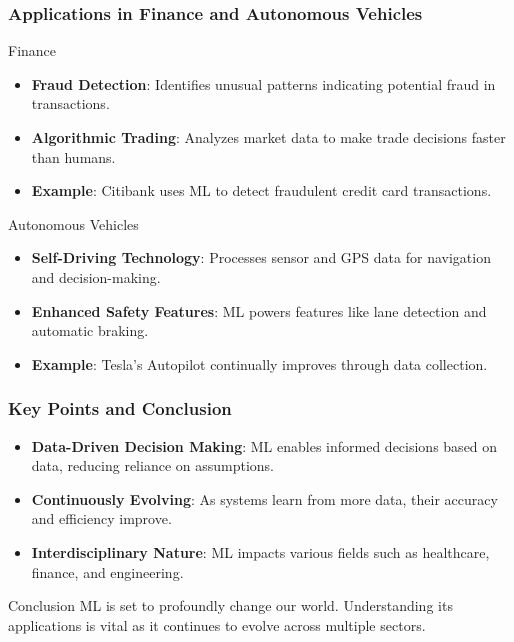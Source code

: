 \documentclass[aspectratio=169]{beamer}
\begin{document}
\begin{frame}[fragile]
    \frametitle{Applications in Finance and Autonomous Vehicles}
    \begin{block}{Finance}
        \begin{itemize}
            \item \textbf{Fraud Detection}: 
                Identifies unusual patterns indicating potential fraud in transactions.
            \item \textbf{Algorithmic Trading}: 
                Analyzes market data to make trade decisions faster than humans.
            \item \textbf{Example}:
                Citibank uses ML to detect fraudulent credit card transactions.
        \end{itemize}
    \end{block}
    
    \begin{block}{Autonomous Vehicles}
        \begin{itemize}
            \item \textbf{Self-Driving Technology}: 
                Processes sensor and GPS data for navigation and decision-making.
            \item \textbf{Enhanced Safety Features}: 
                ML powers features like lane detection and automatic braking.
            \item \textbf{Example}: 
                Tesla’s Autopilot continually improves through data collection.
        \end{itemize}
    \end{block}
\end{frame}

\begin{frame}[fragile]
    \frametitle{Key Points and Conclusion}
    \begin{itemize}
        \item \textbf{Data-Driven Decision Making}:
            ML enables informed decisions based on data, reducing reliance on assumptions.
        \item \textbf{Continuously Evolving}:
            As systems learn from more data, their accuracy and efficiency improve.
        \item \textbf{Interdisciplinary Nature}:
            ML impacts various fields such as healthcare, finance, and engineering.
    \end{itemize}
    \begin{block}{Conclusion}
        ML is set to profoundly change our world. Understanding its applications is vital as it continues to evolve across multiple sectors.
    \end{block}
\end{frame}
\end{document}
